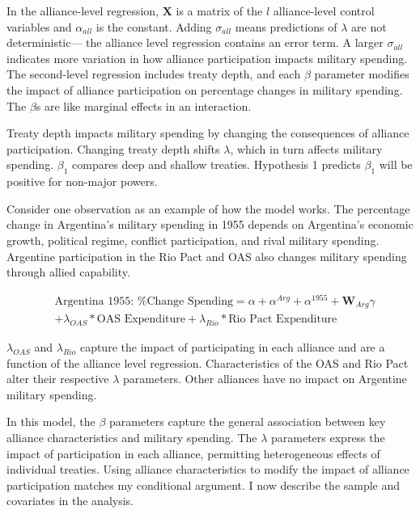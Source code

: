 \documentclass[12pt]{article}
\begin{document}
In the alliance-level regression, $\textbf{X}$ is a matrix of the $l$ alliance-level control variables and $\alpha_{all}$ is the constant.
Adding $\sigma_{all}$ means predictions of $\lambda$ are not deterministic--- the alliance level regression contains an error term. 
A larger $\sigma_{all}$ indicates more variation in how alliance participation impacts military spending. 
The second-level regression includes treaty depth, and each $\beta$ parameter modifies the impact of alliance participation on percentage changes in military spending. 
The $\beta$s are like marginal effects in an interaction. 


Treaty depth impacts military spending by changing the consequences of alliance participation. 
Changing treaty depth shifts $\lambda$, which in turn affects military spending.
$\beta_1$ compares deep and shallow treaties. 
Hypothesis 1 predicts $\beta_1$ will be positive for non-major powers.


Consider one observation as an example of how the model works. 
The percentage change in Argentina's military spending in 1955 depends on Argentina's economic growth, political regime, conflict participation, and rival military spending. 
Argentine participation in the Rio Pact and OAS also changes military spending through allied capability. 


\begin{equation}
\begin{split}
& \mbox{Argentina 1955: \% Change Spending} = \alpha + \alpha^{Arg} + \alpha^{1955} +\textbf{W}_{Arg} \gamma \\
& + \lambda_{OAS} * \mbox{OAS Expenditure} + \lambda_{Rio} * \mbox{Rio Pact Expenditure}
\end{split} 
\end{equation}


$\lambda_{OAS}$ and $\lambda_{Rio}$ capture the impact of participating in each alliance and are a function of the alliance level regression. 
Characteristics of the OAS and Rio Pact alter their respective $\lambda$ parameters.
Other alliances have no impact on Argentine military spending. 


In this model, the $\beta$ parameters capture the general association between key alliance characteristics and military spending. 
The $\lambda$ parameters express the impact of participation in each alliance, permitting heterogeneous effects of individual treaties. 
Using alliance characteristics to modify the impact of alliance participation matches my conditional argument. 
I now describe the sample and covariates in the analysis.  
\end{document}
